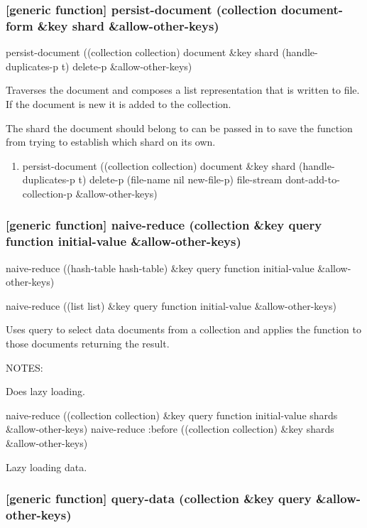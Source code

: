 \documentclass[11pt]{article}
\begin{document}
\subsubsection{[generic function] persist-document (collection document-form \&key shard \&allow-other-keys)}
\label{sec:org8733cd9}

persist-document ((collection collection) document \&key shard (handle-duplicates-p t) delete-p \&allow-other-keys)

Traverses the document and composes a list representation that is
written to file. If the document is new it is added to the collection.

The shard the document should belong to can be passed in to save the
function from trying to establish which shard on its own.

\begin{enumerate}
\item persist-document ((collection collection) document \&key shard (handle-duplicates-p t) delete-p (file-name nil new-file-p) file-stream dont-add-to-collection-p \&allow-other-keys)
\label{sec:orge0536a0}
\end{enumerate}

\subsubsection{[generic function] naive-reduce (collection \&key query function initial-value \&allow-other-keys)}
\label{sec:org12ff36c}

naive-reduce ((hash-table hash-table) \&key query function initial-value  \&allow-other-keys)

naive-reduce ((list list) \&key query function initial-value  \&allow-other-keys)

Uses query to select data documents from a collection and applies the
function to those documents returning the result.

NOTES:

Does lazy loading.

naive-reduce ((collection collection) \&key query function initial-value shards \&allow-other-keys)
naive-reduce :before ((collection collection) \&key shards \&allow-other-keys)

Lazy loading data.

\subsubsection{[generic function] query-data (collection \&key query \&allow-other-keys)}
\label{sec:orge361e2d}
\end{document}
